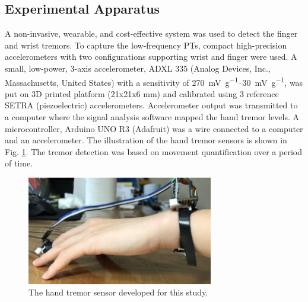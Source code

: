 \documentclass[conference, a4paper]{IEEEtran}
\begin{document}
\subsection{Experimental Apparatus}
%
A non-invasive, wearable, and cost-effective system was used to detect the finger and wrist tremors. To capture the low-frequency PTs, compact high-precision accelerometers with two configurations supporting wrist and finger were used. A small, low-power, 3-axis accelerometer, ADXL 335 (Analog Devices, Inc., Massachusetts, United States) with a sensitivity of \SIrange{270}{30} {\milli \volt \per \g},  was put on 3D printed platform (21x21x6 mm) and calibrated using 3 reference SETRA (piezoelectric) accelerometers. Accelerometer output was transmitted to a computer where the signal analysis software mapped the hand tremor levels. A microcontroller, Arduino UNO R3 (Adafruit) was a wire connected to a computer and an accelerometer. The illustration of the hand tremor sensors is shown in Fig. \ref{fig:sensor}. The tremor detection was based on movement quantification over a period of time.
%
\begin{figure}[h!]
  \centering
  \includegraphics[width=3.2in]{sensor.png}
  \caption{The hand tremor sensor developed for this study.}
  \label{fig:sensor}
\end{figure}
%
\end{document}
